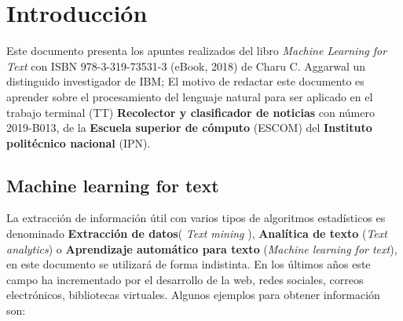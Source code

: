\chapter{Introducción}

Este documento presenta los apuntes realizados del libro \textit{Machine Learning for Text} con  ISBN 978-3-319-73531-3 (eBook, 2018) de Charu C. Aggarwal un distinguido investigador de IBM; El motivo de redactar este documento es aprender sobre el procesamiento del lenguaje natural para ser aplicado en el trabajo terminal (TT) \textbf{Recolector y clasificador de noticias} con número 2019-B013, de la \textbf{Escuela superior de cómputo} (ESCOM) del \textbf{Instituto politécnico nacional} (IPN).\\

\section{Machine learning for text}

La extracción de información útil con varios tipos de algoritmos estadísticos es denominado \textbf{Extracción de datos}( \textit{Text mining} ), \textbf{Analítica de texto} (\textit{Text analytics}) o \textbf{Aprendizaje automático para texto} (\textit{Machine learning for text}), en este documento se utilizará de forma indistinta. En los últimos años este campo ha incrementado por el desarrollo de la web, redes sociales, correos electrónicos, bibliotecas virtuales. Algunos ejemplos para obtener información son:

